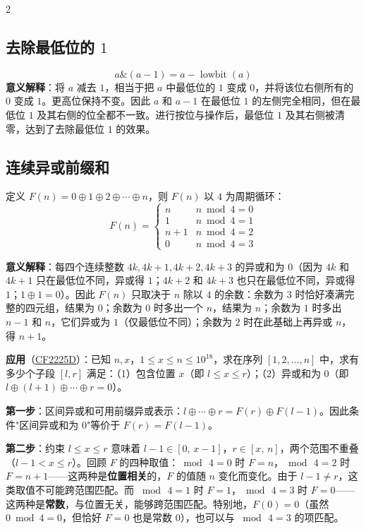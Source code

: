 \begin{multicols*}{2}
		\subsection{去除最低位的 $1$}
		$$a \mathbin{\&} (a - 1) = a - \operatorname{lowbit}(a)$$
		\textbf{意义解释}：将 $a$ 减去 $1$，相当于把 $a$ 中最低位的 $1$ 变成 $0$，并将该位右侧所有的 $0$ 变成 $1$。更高位保持不变。因此 $a$ 和 $a - 1$ 在最低位 $1$ 的左侧完全相同，但在最低位 $1$ 及其右侧的位全都不一致。进行按位与操作后，最低位 $1$ 及其右侧被清零，达到了去除最低位 $1$ 的效果。

		\subsection{连续异或前缀和}
		定义 $F(n) = 0 \oplus 1 \oplus 2 \oplus \cdots \oplus n$，则 $F(n)$ 以 $4$ 为周期循环：
		$$F(n) = \begin{cases}
					 n & n \bmod 4 = 0 \\ 1 & n \bmod 4 = 1 \\ n + 1 & n \bmod 4 = 2 \\ 0 & n \bmod 4 = 3
		\end{cases}$$

		\textbf{意义解释}：每四个连续整数 $4k, 4k+1, 4k+2, 4k+3$ 的异或和为 $0$（因为 $4k$ 和 $4k+1$ 只在最低位不同，异或得 $1$；$4k+2$ 和 $4k+3$ 也只在最低位不同，异或得 $1$；$1 \oplus 1 = 0$）。因此 $F(n)$ 只取决于 $n$ 除以 $4$ 的余数：余数为 $3$ 时恰好凑满完整的四元组，结果为 $0$；余数为 $0$ 时多出一个 $n$，结果为 $n$；余数为 $1$ 时多出 $n-1$ 和 $n$，它们异或为 $1$（仅最低位不同）；余数为 $2$ 时在此基础上再异或 $n$，得 $n + 1$。


		\textbf{应用}（\href{https://codeforces.com/contest/2225/problem/D}{CF2225D}）：已知 $n,x$，$1 \le x \le n \le 10^{18}$，求在序列 $[1, 2, \ldots, n]$ 中，求有多少个子段 $[l, r]$ 满足：（1）包含位置 $x$（即 $l \leq x \leq r$）；（2）异或和为 $0$（即 $l \oplus (l+1) \oplus \cdots \oplus r = 0$）。

		\textbf{第一步}：区间异或和可用前缀异或表示：$l \oplus \cdots \oplus r = F(r) \oplus F(l-1)$。因此条件"区间异或和为 $0$"等价于 $F(r) = F(l-1)$。

		\textbf{第二步}：约束 $l \leq x \leq r$ 意味着 $l - 1 \in [0,\, x-1]$，$r \in [x,\, n]$，两个范围不重叠（$l - 1 < x \leq r$）。回顾 $F$ 的四种取值：$\bmod\, 4 = 0$ 时 $F = n$，$\bmod\, 4 = 2$ 时 $F = n + 1$——这两种是\textbf{位置相关}的，$F$ 的值随 $n$ 变化而变化。由于 $l - 1 \neq r$，这类取值不可能跨范围匹配。而 $\bmod\, 4 = 1$ 时 $F = 1$，$\bmod\, 4 = 3$ 时 $F = 0$——这两种是\textbf{常数}，与位置无关，能够跨范围匹配。特别地，$F(0) = 0$（虽然 $0 \bmod 4 = 0$，但恰好 $F = 0$ 也是常数 $0$），也可以与 $\bmod\, 4 = 3$ 的项匹配。


\end{multicols*}
